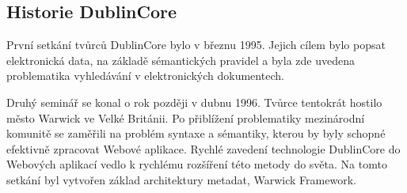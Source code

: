%
%
%
%


\subsection{Historie DublinCore}
\par První setkání tvůrců DublinCore bylo v březnu 1995. Jejich cílem bylo popsat elektronická data, na základě sémantických pravidel a byla zde uvedena problematika vyhledávání v elektronických dokumentech.

\par Druhý seminář se konal o rok později v dubnu 1996. Tvůrce tentokrát hostilo město Warwick ve Velké Británii. Po přiblížení problematiky mezinárodní komunitě se zaměřili na problém syntaxe a sémantiky, kterou by byly schopné efektivně zpracovat Webové aplikace. Rychlé zavedení technologie DublinCore do Webových aplikací vedlo k rychlému rozšíření této metody do světa. Na tomto setkání byl vytvořen základ architektury metadat, Warwick Framework.

